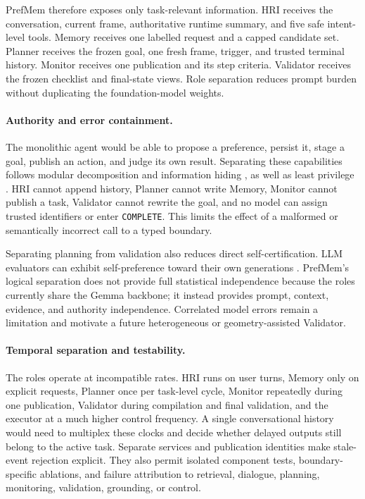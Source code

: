 \documentclass{article}
\begin{document}
PrefMem therefore exposes only task-relevant information. HRI receives the
conversation, current frame, authoritative runtime summary, and five safe
intent-level tools. Memory receives one labelled request and a capped candidate
set. Planner receives the frozen goal, one fresh frame, trigger, and trusted
terminal history. Monitor receives one publication and its step criteria.
Validator receives the frozen checklist and final-state views. Role separation
reduces prompt burden without duplicating the foundation-model weights.

\paragraph{Authority and error containment.}
The monolithic agent would be able to propose a preference, persist it, stage a
goal, publish an action, and judge its own result. Separating these capabilities
follows modular decomposition and information hiding
\parencite{parnas1972modules}, as well as least privilege
\parencite{saltzer1975protection}. HRI cannot append history, Planner cannot
write Memory, Monitor cannot publish a task, Validator cannot rewrite the goal,
and no model can assign trusted identifiers or enter \texttt{COMPLETE}. This
limits the effect of a malformed or semantically incorrect call to a typed
boundary.

Separating planning from validation also reduces direct self-certification.
LLM evaluators can exhibit self-preference toward their own generations
\parencite{panickssery2024selfpreference}. PrefMem's logical separation does
not provide full statistical independence because the roles currently share
the Gemma backbone; it instead provides prompt, context, evidence, and authority
independence. Correlated model errors remain a limitation and motivate a future
heterogeneous or geometry-assisted Validator.

\paragraph{Temporal separation and testability.}
The roles operate at incompatible rates. HRI runs on user turns, Memory only on
explicit requests, Planner once per task-level cycle, Monitor repeatedly during
one publication, Validator during compilation and final validation, and the
executor at a much higher control frequency. A single conversational history
would need to multiplex these clocks and decide whether delayed outputs still
belong to the active task. Separate services and publication identities make
stale-event rejection explicit. They also permit isolated component tests,
boundary-specific ablations, and failure attribution to retrieval, dialogue,
planning, monitoring, validation, grounding, or control.
\end{document}
